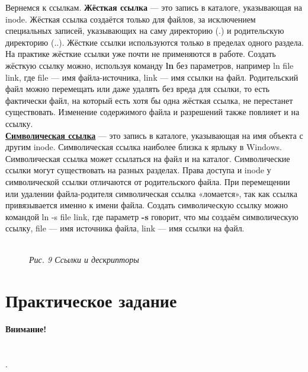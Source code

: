 \documentclass[14pt, a4paper]{article}
\begin{document}
Вернемся к ссылкам. \textbf{Жёсткая ссылка} — это запись в каталоге, указывающая на inode. Жёсткая
ссылка создаётся только для файлов, за исключением специальных записей, указывающих на саму
директорию (.) и родительскую директорию (..). Жёсткие ссылки используются только в пределах
одного раздела. На практике жёсткие ссылки уже почти не применяются в работе. Создать жёсткую
ссылку можно, используя команду \textbf{ln} без параметров, например \colorbox{backcolour}{ln file link}, 
где \colorbox{backcolour}{file} — имя файла-источника, \colorbox{backcolour}{link} — имя ссылки на файл. Родительский файл можно перемещать или даже
удалять без вреда для ссылки, то есть фактически файл, на который есть хотя бы одна жёсткая
ссылка, не перестанет существовать. Изменение содержимого файла и разрешений также повлияет и
на ссылку.\\

\href{https://ru.wikipedia.org/wiki/Символическая_ссылка}{\textbf{Символическая ссылка}} — это запись в каталоге, указывающая на имя объекта с другим inode.
Символическая ссылка наиболее близка к ярлыку в Windows. Символическая ссылка может
ссылаться на файл и на каталог. Символические ссылки могут существовать на разных разделах.
Права доступа и inode у символической ссылки отличаются от родительского файла. При
перемещении или удалении файла-родителя символическая ссылка «ломается», так как ссылка
привязывается именно к имени файла. Создать символическую ссылку можно командой \colorbox{backcolour}{ln -s file
link}, где параметр \textbf{-s} говорит, что мы создаём символическую ссылку, \colorbox{backcolour}{file} — имя источника файла,
\colorbox{backcolour}{link} — имя ссылки на файл.

\begin{figure}[h]
    \centering
    \\ 
    \small\textit{Рис. 9 Ссылки и дескрипторы}  
    \label{framework} 
\end{figure}

\newpage

\section*{Практическое задание} 

\textbf{Внимание!}  \\
 \\
 \\
.
\end{document}
